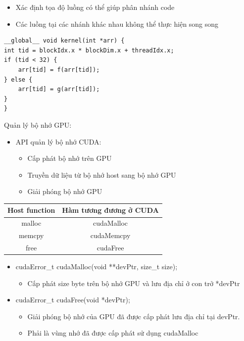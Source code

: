 \documentclass[14pt, a4paper]{article}
\numberwithin{equation}{section}
\numberwithin{figure}{section}
\numberwithin{dl}{section}
\numberwithin{md}{section}
\numberwithin{bd}{section}
\numberwithin{dn}{section}
\numberwithin{hq}{section}
\begin{document}
\begin{itemize}
    \item Xác định tọa độ luồng có thể giúp phân nhánh code
    \item Các luồng tại các nhánh khác nhau không thể thực hiện song song
\end{itemize}
\begin{verbatim}
__global__ void kernel(int *arr) {
int tid = blockIdx.x * blockDim.x + threadIdx.x;
if (tid < 32) {
    arr[tid] = f(arr[tid]);
} else {
    arr[tid] = g(arr[tid]);
}
}
\end{verbatim}

Quản lý bộ nhớ GPU:

\begin{itemize}
    \item API quản lý bộ nhớ CUDA:
    \begin{itemize}
        \item Cấp phát bộ nhớ trên GPU
        \item Truyền dữ liệu từ bộ nhớ host sang bộ nhớ GPU
        \item Giải phóng bộ nhớ GPU
    \end{itemize}
\end{itemize}
\begin{table}[H]
    \centering
    \begin{tabular}{|c|c|}
        \hline
        Host function & Hàm tương đương ở CUDA \\
        \hline
        malloc & cudaMalloc \\
        \hline
        memcpy & cudaMemcpy \\
        \hline
        free & cudaFree \\
        \hline
    \end{tabular}
\end{table}

\begin{itemize}
    \item cudaError\_t cudaMalloc(void **devPtr, size\_t size);
    \begin{itemize}
        \item Cấp phát size byte trên bộ nhớ GPU và lưu địa chỉ ở con trở *devPtr
    \end{itemize}
    \item cudaError\_t cudaFree(void *devPtr);
    \begin{itemize}
        \item Giải phóng bộ nhớ của GPU đã được cấp phát lưu địa chỉ tại devPtr.
        \item Phải là vùng nhớ đã được cấp phát sử dụng cudaMalloc
    \end{itemize}
    
\end{itemize}
\end{document}
